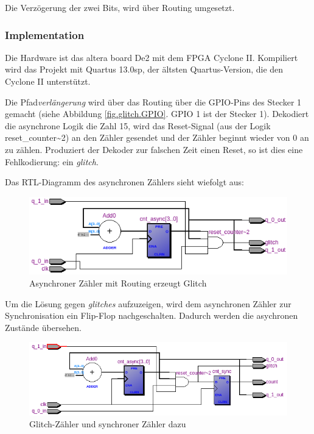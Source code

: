 Die Verzögerung der zwei Bits, wird über Routing umgesetzt. 



\subsubsection{Implementation} 
Die Hardware ist das altera board De2 mit dem FPGA Cyclone II. Kompiliert wird das Projekt mit Quartus 13.0sp, der ältsten Quartus-Version, die den Cyclone II unterstützt.

Die Pfad\textit{verlängerung} wird über das Routing über die GPIO-Pins des Stecker 1 gemacht (siehe Abbildung \ref{fig.glitch.GPIO}. GPIO 1 ist der Stecker 1). Dekodiert die asynchrone Logik die Zahl 15, wird das  Reset-Signal (aus der Logik reset\_counter\~{}2) an den Zähler gesendet und der Zähler beginnt wieder von 0 an zu zählen. Produziert der Dekoder zur falschen Zeit einen Reset, so ist dies eine Fehlkodierung: ein \textit{glitch}.

Das RTL-Diagramm des asynchronen Zählers sieht wiefolgt aus:
\begin{figure}[H]
	\includegraphics[width=1\textwidth]{images/glitch/RTL_asynchron.png}
	\caption{Asynchroner Zähler mit Routing erzeugt Glitch}
	\label{fig.glitch.RTL_nurGlitch}
\end{figure}

Um die Lösung gegen \textit{glitches} aufzuzeigen, wird dem asynchronen Zähler zur Synchronisation ein Flip-Flop nachgeschalten. Dadurch werden die asychronen Zustände übersehen. 
\begin{figure}[H]
	\includegraphics[width=\textwidth]{images/glitch/glitch_asynch_new.png}
	\caption{Glitch-Zähler und synchroner Zähler dazu}
	\label{fig.glitch.RTL_mit_synchr.Zaehler}
\end{figure}

